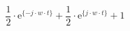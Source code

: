 \[
\frac{1}{2}\cdot
\textrm{e}^{\{-j \cdot w \cdot t \}}
+
\frac{1}{2}\cdot
\textrm{e}^{\{ j \cdot w \cdot t \}}
+
1
\]
